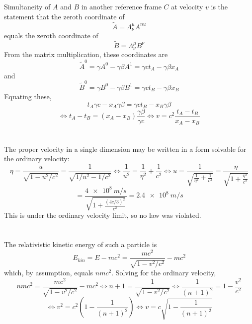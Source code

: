 \documentclass{article}
\begin{document}
\section{}
Simultaneity of $A$ and $B$ in another reference frame $C$ at velocity $v$ is the statement that the zeroth coordinate of
\[
  \tilde{A}=\Lambda_{\nu}^{\mu}A^{nu}
\]
equals the zeroth coordinate of
\[
  \tilde{B}=\Lambda_{\nu}^{\mu}B^{\nu}
\]
From the matrix multiplication, these coordinates are
\[
  \tilde{A}^{0}=\gamma A^{0}-\gamma\beta A^{1}
  =\gamma ct_{A}-\gamma\beta x_{A}
\]
and
\[
  \tilde{B}^{0}=\gamma B^{0}-\gamma\beta B^{1}
  =\gamma ct_{B}-\gamma\beta x_{B}
\]
Equating these,
\[
  t_{A}\gamma c-x_{A}\gamma\beta
  =  \gamma ct_{B}-x_{B}\gamma\beta
\]
\[
  \Leftrightarrow t_{A}-t_{B}=(x_{A}-x_{B})\frac{\gamma\beta}{\gamma c}
  \Leftrightarrow v=c^{2}\frac{t_{A}-t_{B}}{x_{A}-x_{B}}
\]

\section{}
The proper velocity in a single dimension may be written in a form solvable for the ordinary velocity:
\[
  \eta=\frac{u}{\sqrt{1-u^{2}/c^{2}}}=\frac{1}{\sqrt{1/u^{2}-1/c^{2}}}
  \Leftrightarrow \frac{1}{u^{2}}=\frac{1}{\eta^{2}}+\frac{1}{c^{2}}
  \Leftrightarrow u=\frac{1}{\sqrt{\frac{1}{\eta^{2}}+\frac{1}{c^{2}}}}
  =\frac{\eta}{\sqrt{1+\frac{\eta^{2}}{c^{2}}}}
\]
\[
  =\frac{\SI{4e8}{m/s}}{\sqrt{1+\frac{(4c/3)^{2}}{c^{2}}}}
  =\SI{2.4e8}{m/s}
\]
This is under the ordinary velocity limit, so no law was violated.

\section{}
The relativistic kinetic energy of such a particle is
\[
  E_{kin}=E-mc^{2}=\frac{mc^{2}}{\sqrt{1-v^{2}/c^{2}}}-mc^{2}
\]
which, by assumption, equals $nmc^{2}$.
Solving for the ordinary velocity,
\[
  nmc^{2}=\frac{mc^{2}}{\sqrt{1-v^{2}/c^{2}}}-mc^{2}
  \Leftrightarrow n+1=\frac{1}{\sqrt{1-v^{2}/c^{2}}}
  \Leftrightarrow \frac{1}{(n+1)^{2}}=1-\frac{v^{2}}{c^{2}}
\]
\[
  \Leftrightarrow v^{2}=c^{2}\left( 1-\frac{1}{(n+1)^{2}} \right)
  \Leftrightarrow v=c\sqrt{1-\frac{1}{(n+1)^{2}}}
\]
\end{document}

